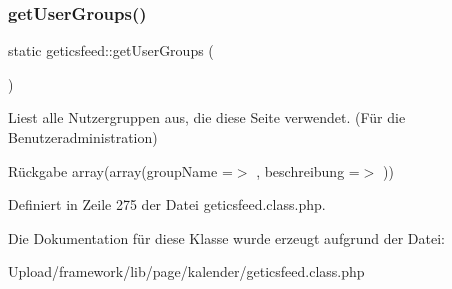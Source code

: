 \subsubsection{\texorpdfstring{get\+User\+Groups()}{getUserGroups()}}
{\footnotesize\ttfamily static geticsfeed\+::get\+User\+Groups (\begin{DoxyParamCaption}{ }\end{DoxyParamCaption})\hspace{0.3cm}{\ttfamily [static]}}

Liest alle Nutzergruppen aus, die diese Seite verwendet. (Für die Benutzeradministration) \begin{DoxyReturn}{Rückgabe}
array(array(\textquotesingle{}group\+Name\textquotesingle{} =$>$ \textquotesingle{}\textquotesingle{}, \textquotesingle{}beschreibung\textquotesingle{} =$>$ \textquotesingle{}\textquotesingle{})) 
\end{DoxyReturn}


Definiert in Zeile 275 der Datei geticsfeed.\+class.\+php.



Die Dokumentation für diese Klasse wurde erzeugt aufgrund der Datei\+:\begin{DoxyCompactItemize}
\item 
Upload/framework/lib/page/kalender/geticsfeed.\+class.\+php\end{DoxyCompactItemize}
